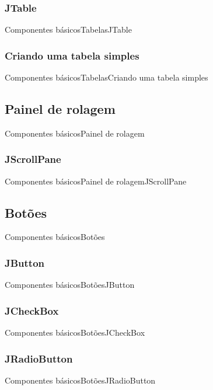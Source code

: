 \documentclass[10pt]{beamer}
\begin{document}
\subsubsection{JTable}
\begin{frame}{Componentes básicos}{Tabelas}{JTable}
\end{frame}{}
\subsubsection{Criando uma tabela simples}
\begin{frame}{Componentes básicos}{Tabelas}{Criando uma tabela simples}
\end{frame}{}
\subsection{Painel de rolagem}
\begin{frame}{Componentes básicos}{Painel de rolagem}
\end{frame}{}
\subsubsection{JScrollPane}
\begin{frame}{Componentes básicos}{Painel de rolagem}{JScrollPane}
\end{frame}{}
\subsection{Botões}
\begin{frame}{Componentes básicos}{Botões}
\end{frame}{}
\subsubsection{JButton}
\begin{frame}{Componentes básicos}{Botões}{JButton}
\end{frame}{}
\subsubsection{JCheckBox}
\begin{frame}{Componentes básicos}{Botões}{JCheckBox}
\end{frame}{}
\subsubsection{JRadioButton}
\begin{frame}{Componentes básicos}{Botões}{JRadioButton}
\end{frame}{}
\end{document}
